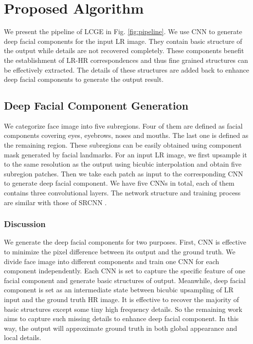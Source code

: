 \documentclass{article}
\begin{document}
\section{Proposed Algorithm}

We present the pipeline of LCGE in Fig. \ref{fig:pipeline}. We use CNN to generate deep facial components for the input LR image. They contain basic structure of the output while details are not recovered completely. These components benefit the establishment of LR-HR correspondences and thus fine grained structures can be effectively extracted. The details of these structures are added back to enhance deep facial components to generate the output result.

\subsection{Deep Facial Component Generation}\label{sec:cnn}

We categorize face image into five subregions. Four of them are defined as facial components covering eyes, eyebrows, noses and mouths. The last one is defined as the remaining region. These subregions can be easily obtained using component mask generated by facial landmarks. For an input LR image, we first upsample it to the same resolution as the output using bicubic interpolation and obtain five subregion patches. Then we take each patch as input to the corresponding CNN to generate deep facial component. We have five CNNs in total, each of them contains three convolutional layers. The network structure and training process are similar with those of SRCNN \cite{chao-pami2015-srcnn}.

\subsubsection{Discussion}
We generate the deep facial components for two purposes. First, CNN is effective to minimize the pixel difference between its output and the ground truth. We divide face image into different components and train one CNN for each component independently. Each CNN is set to capture the specific feature of one facial component and generate basic structures of output. Meanwhile, deep facial component is set as an intermediate state between bicubic upsampling of LR input and the ground truth HR image. It is effective to recover the majority of basic structures except some tiny high frequency details. So the remaining work aims to capture such missing details to enhance deep facial component. In this way, the output will approximate ground truth in both global appearance and local details.
\end{document}
